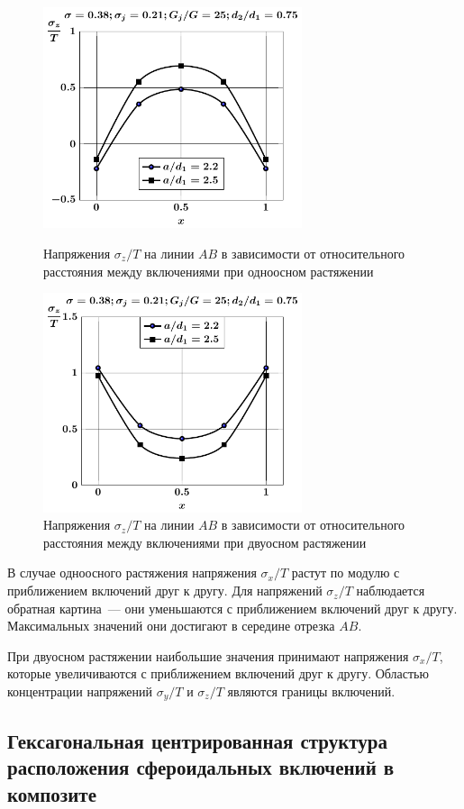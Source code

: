 \begin{figure}[h!]
\centering\footnotesize
\parbox[b]{7.5cm}{\centering\includegraphics[width=7.6cm]{inc9-a-d75-g25-t1-sig_z.pdf}
\caption{Напряжения $\sigma_z/T$ на линии $AB$ в зависимости от относительного расстояния между включениями при одноосном растяжении
\label{f:9:73}}}\hfil\hfil
\parbox[b]{7.5cm}{\centering\includegraphics[width=7.6cm]{inc9-a-d75-g25-t2-sig_z.pdf}
\caption{Напряжения $\sigma_z/T$ на линии $AB$ в зависимости от относительного расстояния между включениями при двуосном растяжении
\label{f:9:74}}}
\end{figure}

В случае одноосного растяжения напряжения $\sigma_x/T$ растут по модулю с приближением включений друг к другу. Для напряжений $\sigma_z/T$ наблюдается обратная картина~--- они уменьшаются с приближением включений друг к другу. Максимальных значений они достигают в середине отрезка $AB$.

При двуосном растяжении наибольшие значения принимают напряжения $\sigma_x/T$, которые увеличиваются с приближением включений друг к другу. Областью концентрации напряжений $\sigma_y/T$ и $\sigma_z/T$ являются границы включений.

\subsection{Гексагональная центрированная структура расположения сфероидальных включений в композите}

